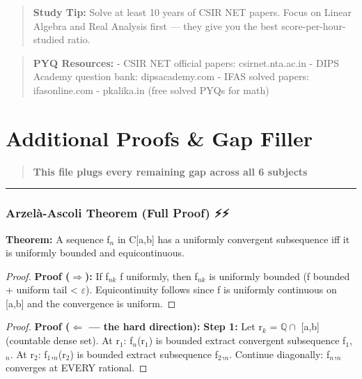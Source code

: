 \documentclass[12pt,a4paper,openany]{book}
\begin{document}
{{\begin{quote}
\textbf{ Study Tip:} Solve at least 10 years of CSIR NET papers. Focus on Linear Algebra and Real Analysis first — they give you the best score-per-hour-studied ratio.
\end{quote}

\begin{quote}
\textbf{ PYQ Resources:}
- CSIR NET official papers: csirnet.nta.ac.in
- DIPS Academy question bank: dipsacademy.com
- IFAS solved papers: ifasonline.com
- pkalika.in (free solved PYQs for math)
\end{quote}

\newpage

\chapter{Additional Proofs \& Gap Filler}


\begin{quote}
\textbf{This file plugs every remaining gap across all 6 subjects}
\end{quote}

\bigskip\noindent\rule{\textwidth}{0.4pt}\bigskip


\subsection{Arzelà-Ascoli Theorem (Full Proof) ⚡⚡}

\begin{tcolorbox}[colback=lightblue,colframe=thmblue,title=\textbf{Theorem},breakable,boxrule=1.5pt]
\textbf{Theorem:} A sequence {f$_n$} in C[a,b] has a uniformly convergent subsequence iff it is uniformly bounded and equicontinuous.
\end{tcolorbox}

\begin{proof}
\textbf{Proof ($\Longrightarrow$):} If f$_{nk}$  f uniformly, then {f$_{nk}$} is uniformly bounded (f bounded + uniform tail < $\varepsilon$). Equicontinuity follows since f is uniformly continuous on [a,b] and the convergence is uniform.
\end{proof}

\begin{proof}
\textbf{Proof ($\Longleftarrow$ — the hard direction):}
\textbf{Step 1:} Let {r$_k$} = $\mathbb{Q}\cap$ [a,b] (countable dense set).
At r$_1$: {f$_n$(r$_1$)} is bounded  extract convergent subsequence {f$_1$,$_n$}.
At r$_2$: {f$_1$,$_n$(r$_2$)} is bounded  extract subsequence {f$_2$,$_n$}.
Continue diagonally: {f$_n$,$_n$} converges at EVERY rational.
\end{proof}

}}
\end{document}
